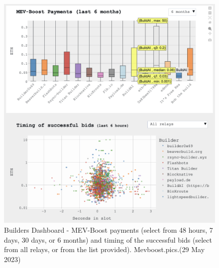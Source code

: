 \documentclass[UTF8]{article}
\begin{document}
\begin{figure}[htbp]
\begin{center}
\includegraphics[width=0.9\linewidth]{images/mevbuilder3}
\caption{Builders Dashboard - MEV-Boost payments (select from 48 hours, 7 days, 30 days, or 6 months) and timing of the successful bids (select from all relays, or from the list provided). Mevboost.pics.(29 May 2023)}
\label{fig:mevbuilder3}
\end{center}
\end{figure}
\end{document}
